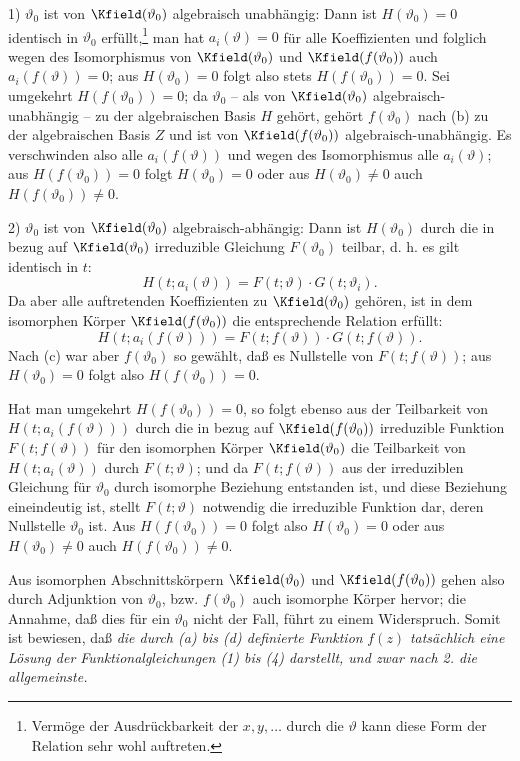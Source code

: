 1) \(\vartheta_0\) ist von \(\Kfield(\vartheta_0)\) algebraisch unabhängig: Dann ist \(H(\vartheta_0)=0\) identisch in \(\vartheta_0\) erfüllt,\footnote{Vermöge der Ausdrückbarkeit der \(x,y,\ldots\) durch die \(\vartheta\) kann diese Form der Relation sehr wohl auftreten.} man hat \(a_i(\vartheta)=0\) für alle Koeffizienten und folglich wegen des Isomorphismus von \(\Kfield(\vartheta_0)\) und \(\Kfield(f(\vartheta_0))\) auch \(a_i(f(\vartheta))=0\); aus \(H(\vartheta_0)=0\) folgt also stets \(H(f(\vartheta_0))=0\). Sei umgekehrt \(H(f(\vartheta_0))=0\); da \(\vartheta_0\) -- als von \(\Kfield(\vartheta_0)\) algebraisch-unabhängig -- zu der algebraischen Basis \(H\) gehört, gehört \(f(\vartheta_0)\) nach (b) zu der algebraischen Basis \(Z\) und ist von \(\Kfield(f(\vartheta_0))\) algebraisch-unabhängig. Es verschwinden also alle \(a_i(f(\vartheta))\) und wegen des Isomorphismus alle \(a_i(\vartheta)\); aus \(H(f(\vartheta_0))=0\) folgt \(H(\vartheta_0)=0\) oder aus \(H(\vartheta_0)\ne0\) auch \(H(f(\vartheta_0))\ne0\).

2) \(\vartheta_0\) ist von \(\Kfield(\vartheta_0)\) algebraisch-abhängig: Dann ist \(H(\vartheta_0)\) durch die in bezug auf \(\Kfield(\vartheta_0)\) irreduzible Gleichung \(F(\vartheta_0)\) teilbar, d. h. es gilt identisch in \(t\):
\[
H(t;a_i(\vartheta))=F(t;\vartheta)\cdot G(t;\vartheta_i).
\]
Da aber alle auftretenden Koeffizienten zu \(\Kfield(\vartheta_0)\) gehören, ist in dem isomorphen Körper \(\Kfield(f(\vartheta_0))\) die entsprechende Relation erfüllt:
\[
H(t;a_i(f(\vartheta)))=F(t;f(\vartheta))\cdot G(t;f(\vartheta)).
\]
Nach (c) war aber \(f(\vartheta_0)\) so gewählt, daß es Nullstelle von \(F(t;f(\vartheta))\); aus \(H(\vartheta_0)=0\) folgt also \(H(f(\vartheta_0))=0\).

Hat man umgekehrt \(H(f(\vartheta_0))=0\), so folgt ebenso aus der Teilbarkeit von \(H(t;a_i(f(\vartheta)))\) durch die in bezug auf \(\Kfield(f(\vartheta_0))\) irreduzible Funktion \(F(t;f(\vartheta))\) für den isomorphen Körper \(\Kfield(\vartheta_0)\) die Teilbarkeit von \(H(t;a_i(\vartheta))\) durch \(F(t;\vartheta)\); und da \(F(t;f(\vartheta))\) aus der irreduziblen Gleichung für \(\vartheta_0\) durch isomorphe Beziehung entstanden ist, und diese Beziehung eineindeutig ist, stellt \(F(t;\vartheta)\) notwendig die irreduzible Funktion dar, deren Nullstelle \(\vartheta_0\) ist. Aus \(H(f(\vartheta_0))=0\) folgt also \(H(\vartheta_0)=0\) oder aus \(H(\vartheta_0)\ne0\) auch \(H(f(\vartheta_0))\ne0\).

Aus isomorphen Abschnittskörpern \(\Kfield(\vartheta_0)\) und \(\Kfield(f(\vartheta_0))\) gehen also durch Adjunktion von \(\vartheta_0\), bzw. \(f(\vartheta_0)\) auch isomorphe Körper hervor; die Annahme, daß dies für ein \(\vartheta_0\) nicht der Fall, führt zu einem Widerspruch. Somit ist bewiesen, daß \emph{die durch (a) bis (d) definierte Funktion} \(f(z)\) \emph{tatsächlich eine Lösung der Funktionalgleichungen (1) bis (4) darstellt, und zwar nach 2. die allgemeinste.}

